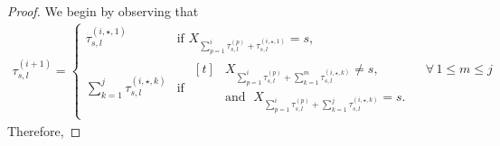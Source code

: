 \documentclass[twoside,11pt]{article}
\newcommand{\pow}[1]{^{(#1)}}%
\numberwithin{equation}{section}
\newcommand{\lb}{\left[}
\newcommand{\rb}{\right]}
\newcommand{\Fcal}{\mathcal{F}}
\newcommand{\expec}{\mathbb{E}}
\newcommand{\indicator}{\mathbbm{1}}
\begin{document}
\begin{proof}
    We begin by observing that
\begin{align*}
  \tau_{s,l}\pow{i+1}
  =\begin{cases}
      \tau_{s,l}\pow{i,\star,1}
      & \text{if } 
      X_{\sum_{p=1}^i \tau_{s,l}\pow{p}+ \tau_{s,l}\pow{i,\star,1}} = s,
      \\[6pt]
      \displaystyle \sum_{k=1}^j \tau_{s,l}\pow{i,\star,k}
      & \text{if }
        \begin{aligned}[t]
          &X_{\sum_{p=1}^i \tau_{s,l}\pow{p}+ \sum_{k=1}^{m}
             \tau_{s,l}\pow{i,\star,k}} \neq s,
          &&\forall\, 1 \le m \le j
          \\[2pt]
          &\text{and }\;
          X_{\sum_{p=1}^i \tau_{s,l}\pow{p}
             + \sum_{k=1}^j \tau_{s,l}\pow{i,\star,k}} = s.
        \end{aligned}
    \end{cases}
\end{align*}
Therefore, 

\end{proof}
\end{document}
